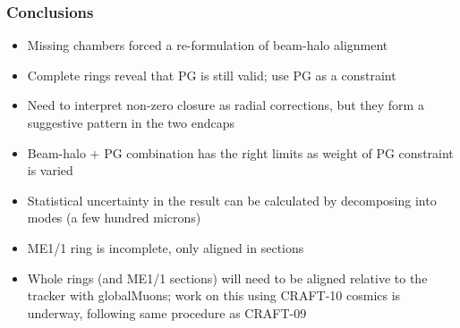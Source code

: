 \documentclass[compress]{beamer}
\begin{document}
\begin{frame}
\frametitle{Conclusions}

\begin{itemize}\setlength{\itemsep}{0.25 cm}
\item Missing chambers forced a re-formulation of beam-halo alignment
\item Complete rings reveal that PG is still valid; use PG as a constraint
\item Need to interpret non-zero closure as radial corrections, but they form a suggestive pattern in the two endcaps
\item Beam-halo $+$ PG combination has the right limits as weight of PG constraint is varied
\item Statistical uncertainty in the result can be calculated by decomposing into modes (a few hundred microns)
\item ME1/1 ring is incomplete, only aligned in sections
\item Whole rings (and ME1/1 sections) will need to be aligned relative to the tracker with globalMuons; work on this using CRAFT-10 cosmics is underway, following same procedure as CRAFT-09
\end{itemize}

\label{numpages}
\end{frame}
\end{document}
